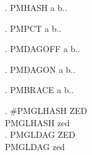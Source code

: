 
\GlossPhantomAlign

\ex. PMHASH a  b.\z.

\ex. PMPCT a  b.\z.

\ex. PMDAGOFF a  b.\z.

\GlossPhantomChars{*?([<\#\%\dag}
\ex. PMDAGON a  b.\z.

\ex. PMBRACE a \altn{PSTEME}{{[}PSTEME} b.\z.

\ex. \gll \#PMGLHASH ZED\\
     PMGLHASH zed\\

\ex. \gll \dag PMGLDAG ZED\\
     PMGLDAG zed\\

